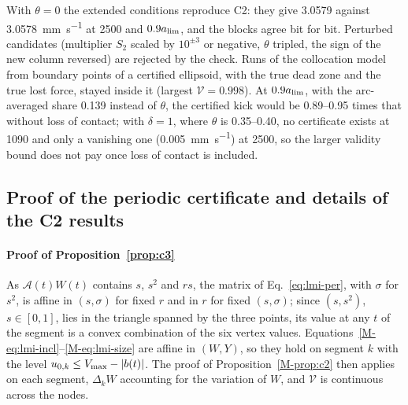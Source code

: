With $\theta=0$ the extended conditions reproduce C2: they give 3.0579 against \SI{3.0578}{\milli\metre\per\second} at \SI{2500}{\rpm} and $0.9a_{\lim}$, and the blocks agree bit for bit. Perturbed candidates (multiplier $S_2$ scaled by $10^{\pm3}$ or negative, $\theta$ tripled, the sign of the new column reversed) are rejected by the check. Runs of the collocation model from boundary points of a certified ellipsoid, with the true dead zone and the true lost force, stayed inside it (largest $\mathcal V=0.998$). At $0.9a_{\lim}$, with the arc-averaged share 0.139 instead of $\theta$, the certified kick would be 0.89--\SI{0.95}{} times that without loss of contact; with $\delta=1$, where $\theta$ is 0.35--0.40, no certificate exists at \SI{1090}{\rpm} and only a vanishing one (\SI{0.005}{\milli\metre\per\second}) at \SI{2500}{\rpm}, so the larger validity bound does not pay once loss of contact is included.

\subsection{Proof of the periodic certificate and details of the C2 results}\label{supp:proof-c3}

\paragraph{Proof of Proposition~\ref{prop:c3}} As $\mathcal A(t)W(t)$ contains $s$, $s^2$ and $rs$, the matrix of Eq.~\eqref{eq:lmi-per}, with $\sigma$ for $s^2$, is affine in $(s,\sigma)$ for fixed $r$ and in $r$ for fixed $(s,\sigma)$; since $(s,s^2)$, $s\in[0,1]$, lies in the triangle spanned by the three points, its value at any $t$ of the segment is a convex combination of the six vertex values. Equations~\eqref{M-eq:lmi-incl}--\eqref{M-eq:lmi-size} are affine in $(W,Y)$, so they hold on segment $k$ with the level $u_{0,k}\le V_{\max}-\lvert b(t)\rvert$. The proof of Proposition~\ref{M-prop:c2} then applies on each segment, $\Delta_kW$ accounting for the variation of $W$, and $\mathcal V$ is continuous across the nodes.


